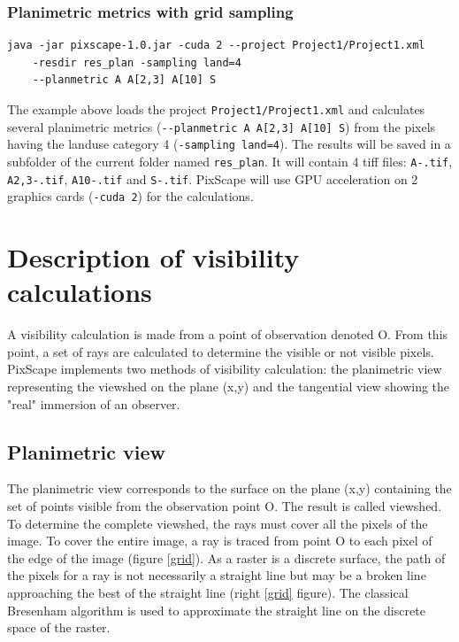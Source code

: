 \documentclass{report}
\begin{document}
\subsection{Planimetric metrics with grid sampling}
\begin{Verbatim}
java -jar pixscape-1.0.jar -cuda 2 --project Project1/Project1.xml
	-resdir res_plan -sampling land=4 
	--planmetric A A[2,3] A[10] S
\end{Verbatim}
The example above loads the project \verb|Project1/Project1.xml| and calculates several planimetric metrics (\verb|--planmetric A A[2,3] A[10] S|) from the pixels having the landuse category 4 (\verb|-sampling land=4|). The results will be saved in a subfolder of the current folder named \verb|res_plan|. It will contain 4 tiff files: \verb|A-.tif|, \verb|A2,3-.tif|, \verb|A10-.tif| and \verb|S-.tif|. PixScape will use GPU acceleration on 2 graphics cards (\verb|-cuda 2|) for the calculations.


\chapter{Description of visibility calculations}
\label{principles}
A visibility calculation is made from a point of observation denoted O. From this point, a set of rays are calculated to determine the visible or not visible pixels.
PixScape implements two methods of visibility calculation: the planimetric view representing the viewshed on the plane (x,y) and the tangential view showing the "real" immersion of an observer.

\section{Planimetric view}
The planimetric view corresponds to the surface on the plane (x,y) containing the set of points visible from the observation point O. The result is called viewshed.
To determine the complete viewshed, the rays must cover all the pixels of the image.
To cover the entire image, a ray is traced from point O to each pixel of the edge of the image (figure \ref{grid}). As a raster is a discrete surface, the path of the pixels for a ray is not necessarily a straight line but may be a broken line approaching the best of the straight line (right \ref{grid} figure). The classical Bresenham algorithm is used to approximate the straight line on the discrete space of the raster.
\end{document}
